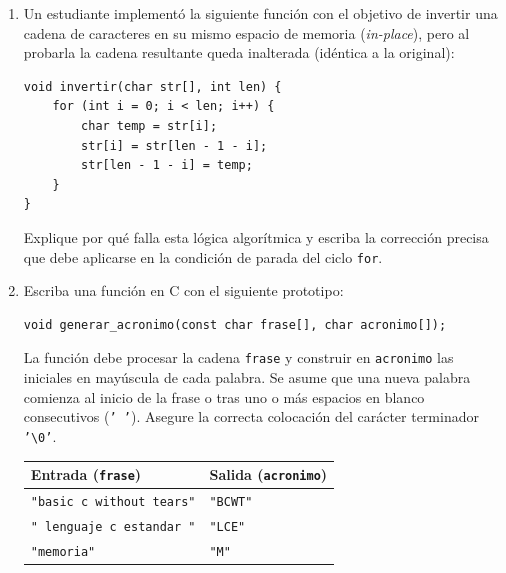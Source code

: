\documentclass[11pt,letterpaper]{article}
\begin{document}
\begin{enumerate}[label=\textbf{\arabic*.}]
\begin{enumerate}[label=(\alph*)]
        \item Un estudiante implementó la siguiente función con el objetivo de invertir una cadena de caracteres en su mismo espacio de memoria (\textit{in-place}), pero al probarla la cadena resultante queda inalterada (idéntica a la original):
        \begin{lstlisting}[style=customc]
void invertir(char str[], int len) {
    for (int i = 0; i < len; i++) {
        char temp = str[i];
        str[i] = str[len - 1 - i];
        str[len - 1 - i] = temp;
    }
}
        \end{lstlisting}
        Explique por qué falla esta lógica algorítmica y escriba la corrección precisa que debe aplicarse en la condición de parada del ciclo \texttt{for}.

        \item Escriba una función en C con el siguiente prototipo:
        \begin{lstlisting}[style=customc, numbers=none]
void generar_acronimo(const char frase[], char acronimo[]);
        \end{lstlisting}
        La función debe procesar la cadena \texttt{frase} y construir en \texttt{acronimo} las iniciales en mayúscula de cada palabra. Se asume que una nueva palabra comienza al inicio de la frase o tras uno o más espacios en blanco consecutivos (\texttt{' '}). Asegure la correcta colocación del carácter terminador \texttt{'\textbackslash 0'}.
        
        \begin{center}
        \begin{tabular}{ll}
        \toprule
        \textbf{Entrada (\texttt{frase})} & \textbf{Salida (\texttt{acronimo})} \\
        \midrule
        \texttt{"basic c without tears"} & \texttt{"BCWT"} \\
        \texttt{"  lenguaje   c   estandar  "} & \texttt{"LCE"} \\
        \texttt{"memoria"} & \texttt{"M"} \\
        \bottomrule
        \end{tabular}
        \end{center}
        \vspace{6cm}
    \end{enumerate}

\end{enumerate}
\end{document}
